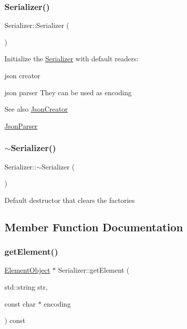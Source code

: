 \subsubsection{\texorpdfstring{Serializer()}{Serializer()}}
{\footnotesize\ttfamily Serializer\+::\+Serializer (\begin{DoxyParamCaption}{ }\end{DoxyParamCaption})}

Initialize the \mbox{\hyperlink{classSerializer}{Serializer}} with default readers\+:
\begin{DoxyItemize}
\item json creator
\item json parser They can be used as encoding \begin{DoxySeeAlso}{See also}
\mbox{\hyperlink{classJsonCreator}{Json\+Creator}} 

\mbox{\hyperlink{classJsonParser}{Json\+Parser}} 
\end{DoxySeeAlso}

\end{DoxyItemize}\mbox{\label{classSerializer_a42a7d2d8e622ad1ef5f869813b498aa9}} 
\subsubsection{\texorpdfstring{$\sim$\+Serializer()}{~Serializer()}}
{\footnotesize\ttfamily Serializer\+::$\sim$\+Serializer (\begin{DoxyParamCaption}{ }\end{DoxyParamCaption})\hspace{0.3cm}{\ttfamily [virtual]}}

Default destructor that clears the factories 

\subsection{Member Function Documentation}
\mbox{\label{classSerializer_ab3bcdbd49167109de13e03878337018a}} 
\subsubsection{\texorpdfstring{get\+Element()}{getElement()}}
{\footnotesize\ttfamily \mbox{\hyperlink{classElementObject}{Element\+Object}} $\ast$ Serializer\+::get\+Element (\begin{DoxyParamCaption}\item[{std\+::string}]{str,  }\item[{const char $\ast$}]{encoding }\end{DoxyParamCaption}) const}

